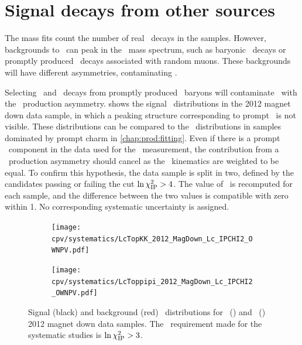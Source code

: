 \begin{table}
  \centering
  \caption{%
    Shifts in the measurement of \dACP\ due to background asymmetries not 
    complete removed during the kinematic weighting.
    The total shift $\Delta{A}$ is the sum of the individual ones, and all 
    shifts are given in \num{e-4}.
  }
  \label{tab:cpv:syst:asym:results}
  
\end{table}

\section{Signal decays from other sources}
\label{chap:cpv:syst:bkg}

The mass fits count the number of real \PLambdac\ decays in the samples.
However, backgrounds to \LbToLcmuX\ can peak in the \PLambdac\ mass spectrum, 
such as baryonic \PB\ decays or promptly produced \PLambdac\ decays associated 
with random muons.
These backgrounds will have different asymmetries, contaminating \dACP\@.

Selecting \pKK\ and \ppipi\ decays from promptly produced \PLambdac\ baryons 
will contaminate \dACP\ with the \PLambdac\ production asymmetry.
 shows the signal \lnipchisq\ distributions in the 
2012 magnet down data sample, in which a peaking structure corresponding to 
prompt \PLambdac\ is not visible.
These distributions can be compared to the \lnipchisq\ distributions in samples 
dominated by prompt charm in \cref{chap:prod:fitting}.
Even if there is a prompt \PLambdac\ component in the data used for the \dACP\ 
measurement, the contribution from a \PLambdac\ production asymmetry should 
cancel as the \PLambdac\ kinematics are weighted to be equal.
To confirm this hypothesis, the data sample is split in two, defined by the 
candidates passing or failing the cut $\ln\chi^2_{\textnormal{IP}} > 4$.
The value of \dACP\ is recomputed for each sample, and the difference between 
the two values is compatible with zero within \SI{1}{\sigma}.
No corresponding systematic uncertainty is assigned.

\begin{figure}
  \begin{subfigure}[b]{0.5\textwidth}
    \texttt{[image: cpv/systematics/LcTopKK\_2012\_MagDown\_Lc\_IPCHI2\_OWNPV.pdf]}
    \caption{\pKK}
    \label{fig:cpv:syst:ipchisq:pKK}
  \end{subfigure}
  \begin{subfigure}[b]{0.5\textwidth}
    \texttt{[image: cpv/systematics/LcToppipi\_2012\_MagDown\_Lc\_IPCHI2\_OWNPV.pdf]}
    \caption{\ppipi}
    \label{fig:cpv:syst:ipchisq:ppipi}
  \end{subfigure}
  \caption{%
    Signal (black) and background (red) \lnipchisq\ distributions for 
    \pKK~(\subref*{fig:cpv:syst:ipchisq:pKK}) and 
    \ppipi~() 2012 magnet down data 
    samples.
    The \lnipchisq\ requirement made for the systematic studies is $\ln\chi^2_{\textnormal{IP}} 
    > 3$.
  }
  \label{fig:cpv:syst:ipchisq}
\end{figure}

